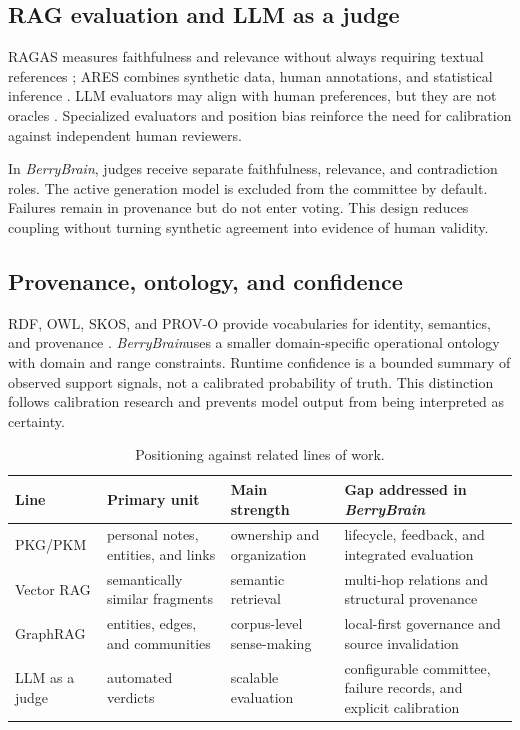 \documentclass{sbc2023}
\newcommand{\BerryBrain}{\textit{BerryBrain}}
\begin{document}
\subsection{RAG evaluation and LLM as a judge}

RAGAS measures faithfulness and relevance without always requiring textual references
\cite{es2024ragas}; ARES combines synthetic data, human annotations, and statistical inference
\cite{saadfalcon2024ares}. LLM evaluators may align with human preferences, but they are not
oracles \cite{liu2023geval}. Specialized evaluators \cite{kim2024prometheus} and position bias
\cite{shi2025judges} reinforce the need for calibration against independent human reviewers.

In \BerryBrain, judges receive separate faithfulness, relevance, and contradiction roles. The
active generation model is excluded from the committee by default. Failures remain in provenance
but do not enter voting. This design reduces coupling without turning synthetic agreement into
evidence of human validity.

\subsection{Provenance, ontology, and confidence}

RDF, OWL, SKOS, and PROV-O provide vocabularies for identity, semantics, and provenance
\cite{rdf11,owl2,skos,prov}. \BerryBrain uses a smaller domain-specific operational ontology with
domain and range constraints. Runtime confidence is a bounded summary of observed support signals,
not a calibrated probability of truth. This distinction follows calibration research
\cite{guo2017calibration} and prevents model output from being interpreted as certainty.

\begin{table}[!t]
\caption{Positioning against related lines of work.}
\label{tab:position}
\small
\begin{tabularx}{\textwidth}{p{2.6cm}YYY}
\toprule
Line & Primary unit & Main strength & Gap addressed in \BerryBrain \\
\midrule
PKG/PKM & personal notes, entities, and links & ownership and organization & lifecycle, feedback, and integrated evaluation \\
Vector RAG & semantically similar fragments & semantic retrieval & multi-hop relations and structural provenance \\
GraphRAG & entities, edges, and communities & corpus-level sense-making & local-first governance and source invalidation \\
LLM as a judge & automated verdicts & scalable evaluation & configurable committee, failure records, and explicit calibration \\
\bottomrule
\end{tabularx}
\end{table}
\FloatBarrier
\end{document}
